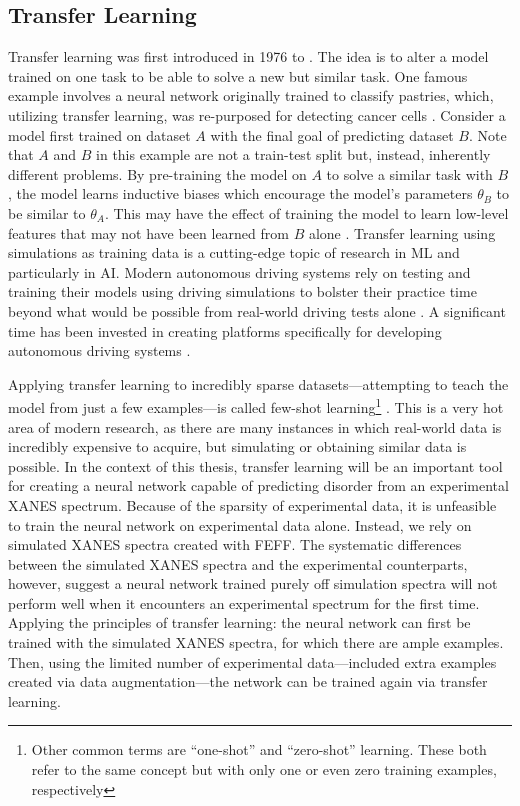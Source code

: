 \subsection{Transfer Learning}
Transfer learning was first introduced in 1976 to \cite{transferlearning-reminder} \cite{transferlearning2} \cite{transferlearning3}. The idea is to alter a model trained on one task to be able to solve a new but similar task. One famous example involves a neural network originally trained to classify pastries, which, utilizing transfer learning, was re-purposed for detecting cancer cells \cite{ny-pastry-article}. Consider a model first trained on dataset $ A $ with the final goal of predicting dataset $ B $. Note that $ A $ and $ B $ in this example are not a train-test split but, instead, inherently different problems. By pre-training the model on $ A $ to solve a similar task with $ B $, the model learns inductive biases which encourage the model's parameters $ \theta_B $ to be similar to $ \theta_A $. This may have the effect of training the model to learn low-level features that may not have been learned from $ B $ alone  \cite{transferBook}. Transfer learning using simulations as training data is a cutting-edge topic of research in ML and particularly in AI. Modern autonomous driving systems rely on testing and training their models using driving simulations to bolster their practice time beyond what would be possible from real-world driving tests alone  \cite{mit-self-driving-car-simulations}. A significant time has been invested in creating platforms specifically for developing autonomous driving systems \cite{carla-dosovitskiy2017}. 

Applying transfer learning to incredibly sparse datasets---attempting to teach the model from just a few examples---is called few-shot learning\footnote{Other common terms are ``one-shot''  \cite{one-shot-learning} and ``zero-shot'' \cite{zero-shot-learning} learning. These both refer to the same concept but with only one or even zero training examples, respectively} \cite{few-shot-learning}. This is a very hot area of modern research, as there are many instances in which real-world data is incredibly expensive to acquire, but simulating or obtaining similar data is possible.
In the context of this thesis, transfer learning will be an important tool for creating a neural network capable of predicting disorder from an experimental XANES spectrum. Because of the sparsity of experimental data, it is unfeasible to train the neural network on experimental data alone. Instead, we rely on simulated XANES spectra created with FEFF. The systematic differences between the simulated XANES spectra and the experimental counterparts, however, suggest a neural network trained purely off simulation spectra will not perform well when it encounters an experimental spectrum for the first time. Applying the principles of transfer learning: the neural network can first be trained with the simulated XANES spectra, for which there are ample examples. Then, using the limited number of experimental data---included extra examples created via data augmentation---the network can be trained again via transfer learning.


